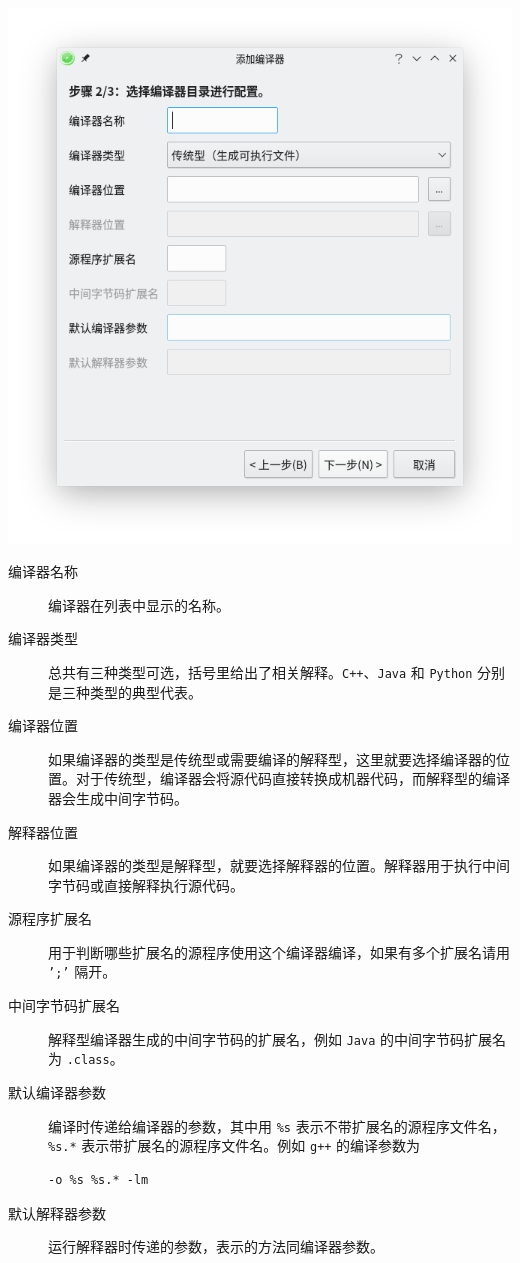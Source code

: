 \documentclass[UTF-8]{ctexart}
\begin{document}
				\begin{center}
					\includegraphics[scale=0.7]{pics/addcompiler2.png}
				\end{center}
				
				\begin{description}
					\item[编译器名称] 编译器在列表中显示的名称。
					\item[编译器类型] 总共有三种类型可选，括号里给出了相关解释。\texttt{C++}、\texttt{Java} 和 \texttt{Python} 分别是三种类型的典型代表。
					\item[编译器位置] 如果编译器的类型是传统型或需要编译的解释型，这里就要选择编译器的位置。对于传统型，编译器会将源代码直接转换成机器代码，而解释型的编译器会生成中间字节码。
					\item[解释器位置] 如果编译器的类型是解释型，就要选择解释器的位置。解释器用于执行中间字节码或直接解释执行源代码。
					\item[源程序扩展名] 用于判断哪些扩展名的源程序使用这个编译器编译，如果有多个扩展名请用 \texttt{';'} 隔开。
					\item[中间字节码扩展名] 解释型编译器生成的中间字节码的扩展名，例如 \texttt{Java} 的中间字节码扩展名为 \texttt{.class}。
					\item[默认编译器参数] 编译时传递给编译器的参数，其中用 \texttt{\%s} 表示不带扩展名的源程序文件名，\texttt{\%s.*} 表示带扩展名的源程序文件名。例如 \texttt{g++} 的编译参数为
					\begin{lstlisting}[frame=shadowbox,basicstyle=\ttfamily]
-o %s %s.* -lm
					\end{lstlisting}
					\item[默认解释器参数] 运行解释器时传递的参数，表示的方法同编译器参数。
				\end{description}
				
\end{document}
